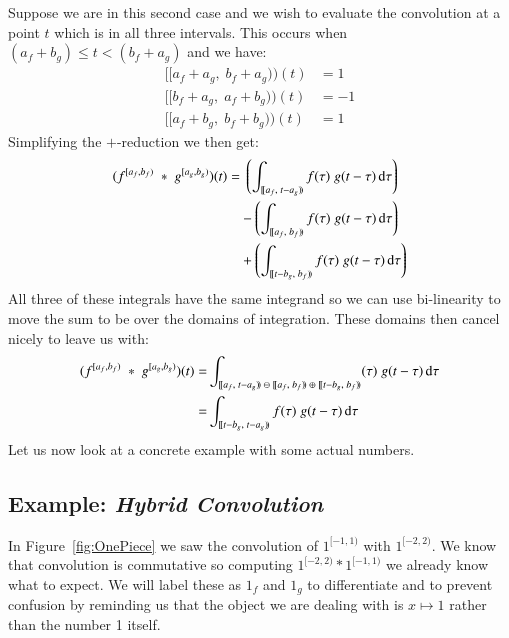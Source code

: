 \pagebreak


Suppose we are in this second case and we wish to evaluate the convolution at a point $t$ which is in all three intervals.
This occurs when $(a_f+b_g) \leq t < (b_f+a_g)$ and we have:
\begin{align*}
	[\![a_f+a_g, \; b_f+a_g)\!)(t) &= 1 \\
	[\![b_f+a_g, \; a_f+b_g)\!)(t) &= -1 \\
	[\![a_f+b_g,\; b_f+b_g)\!)(t) &= 1
\end{align*}
Simplifying the $+$-reduction we then get:
\begin{align}
	(f^{[a_f,b_f)} \;*\; g^{[a_g,b_g)}) (t) = 
		& \; \left( 
			\int_{[\![a_f,\;t-a_g)\!)} f(\tau) \; g(t-\tau) \diff\tau \right) 
				\notag \\ &- \left( 
			\int_{[\![a_f,\;b_f)\!)} f(\tau) \; g(t-\tau) \diff\tau \right)
				\notag \\ &+ \left( 
			\int_{[\![t-b_g,\;b_f)\!)} f(\tau) \; g(t-\tau) \diff\tau \right) 
\end{align}
All three of these integrals have the same integrand so we can use bi-linearity to move the sum to be over the domains
of integration.
These domains then cancel nicely to leave us with:
\begin{align}
	\label{eqn:HybridConvMidFinal}
	(f^{[a_f,b_f)} \;*\; g^{[a_g,b_g)}) (t) 
		= & \int_{
				[\![a_f,\;t-a_g)\!) \;\ominus\; [\![a_f,\;b_f)\!) \;\oplus\; [\![t-b_g,\;b_f)\!) 
				} 
				(\tau) \; g(t-\tau) \diff\tau \notag\\
		= & \int_{
				[\![t-b_g,\;t-a_g)\!)
				} 
				f(\tau) \; g(t-\tau) \diff\tau
\end{align}
Let us now look at a concrete example with some actual numbers.



\subsection{Example: \emph{Hybrid Convolution}}


In Figure~\ref{fig:OnePiece} we saw the convolution of $1^{[-1,1)}$ with $1^{[-2,2)}$.
We know that convolution is commutative so computing $1^{[-2,2)} * 1^{[-1,1)}$ we already know what to expect.
We will label these as $1_f$ and $1_g$ to differentiate and to prevent confusion by reminding us that the object we are 
dealing with is $x \mapsto 1$ rather than the number 1 itself.



